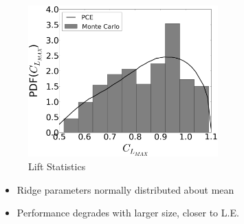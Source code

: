 \documentclass[9pt]{beamer}
\begin{document}
\begin{frame}
\begin{minipage}[t]{0.45\linewidth}
\begin{figure}[t]
\end{figure}
\vspace{-0.6cm}
\begin{figure}[t]
\includegraphics[width=0.65\textwidth]{MCgpcPDFLargeUnc_CL}
\caption{Lift Statistics}
\end{figure}
\end{minipage}
\begin{itemize}
\item Ridge parameters normally distributed about mean
\item Performance degrades with larger size, closer to L.E.
\end{itemize}
\end{frame}
\end{document}
